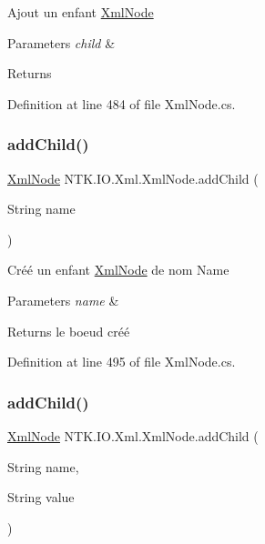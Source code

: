 Ajout un enfant \mbox{\hyperlink{class_n_t_k_1_1_i_o_1_1_xml_1_1_xml_node}{Xml\+Node}} 


\begin{DoxyParams}{Parameters}
{\em child} & \\
\hline
\end{DoxyParams}
\begin{DoxyReturn}{Returns}

\end{DoxyReturn}


Definition at line 484 of file Xml\+Node.\+cs.

\mbox{\label{class_n_t_k_1_1_i_o_1_1_xml_1_1_xml_node_aff52f67ea0200d581a1e584bf5406272}} 
\subsubsection{\texorpdfstring{addChild()}{addChild()}\hspace{0.1cm}{\footnotesize\ttfamily [2/3]}}
{\footnotesize\ttfamily \mbox{\hyperlink{class_n_t_k_1_1_i_o_1_1_xml_1_1_xml_node}{Xml\+Node}} N\+T\+K.\+I\+O.\+Xml.\+Xml\+Node.\+add\+Child (\begin{DoxyParamCaption}\item[{String}]{name }\end{DoxyParamCaption})}



Créé un enfant \mbox{\hyperlink{class_n_t_k_1_1_i_o_1_1_xml_1_1_xml_node}{Xml\+Node}} de nom Name 


\begin{DoxyParams}{Parameters}
{\em name} & \\
\hline
\end{DoxyParams}
\begin{DoxyReturn}{Returns}
le boeud créé
\end{DoxyReturn}


Definition at line 495 of file Xml\+Node.\+cs.

\mbox{\label{class_n_t_k_1_1_i_o_1_1_xml_1_1_xml_node_a7e8e593c8aea167a097f1697130e49e8}} 
\subsubsection{\texorpdfstring{addChild()}{addChild()}\hspace{0.1cm}{\footnotesize\ttfamily [3/3]}}
{\footnotesize\ttfamily \mbox{\hyperlink{class_n_t_k_1_1_i_o_1_1_xml_1_1_xml_node}{Xml\+Node}} N\+T\+K.\+I\+O.\+Xml.\+Xml\+Node.\+add\+Child (\begin{DoxyParamCaption}\item[{String}]{name,  }\item[{String}]{value }\end{DoxyParamCaption})}



